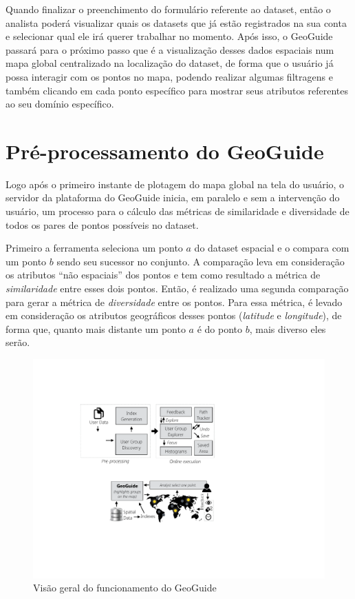 Quando finalizar o preenchimento do formulário referente ao dataset, então o analista poderá visualizar quais os datasets que já estão registrados na sua conta e selecionar qual ele irá querer trabalhar no momento. Após isso, o GeoGuide passará para o próximo passo que é a visualização desses dados espaciais num mapa global centralizado na localização do dataset, de forma que o usuário já possa interagir com os pontos no mapa, podendo realizar algumas filtragens e também clicando em cada ponto específico para mostrar seus atributos referentes ao seu domínio específico.

\section{Pré-processamento do GeoGuide}

Logo após o primeiro instante de plotagem do mapa global na tela do usuário, o servidor da plataforma do GeoGuide inicia, em paralelo e sem a intervenção do usuário, um processo para o cálculo das métricas de similaridade e diversidade de todos os pares de pontos possíveis no dataset.

Primeiro a ferramenta seleciona um ponto $a$ do dataset espacial e o compara com um ponto $b$ sendo seu sucessor no conjunto. A comparação leva em consideração os atributos ``não espaciais'' dos pontos e tem como resultado a métrica de \textit{similaridade} entre esses dois pontos. Então, é realizado uma segunda comparação para gerar a métrica de \textit{diversidade} entre os pontos. Para essa métrica, é levado em consideração os atributos geográficos desses pontos (\textit{latitude} e \textit{longitude}), de forma que, quanto mais distante um ponto $a$ é do ponto $b$, mais diverso eles serão.  

\begin{figure}[h]
	\centering
	\includegraphics[width=\textwidth]{images/geoguide-pre-processamento.pdf}
	\caption{Visão geral do funcionamento do GeoGuide}
	\label{fig:geoguide-pre-processamento}
	\vspace{-10pt}
\end{figure}

